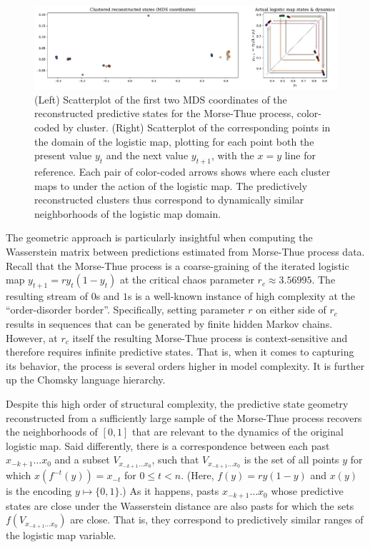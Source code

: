 \documentclass[sigconf, anonymous, review]{acmart}
\begin{document}
\begin{figure}[h]
\centering
\includegraphics[width=\linewidth]{../plots/feig_MDS.pdf}
\caption{(Left) Scatterplot of the first two MDS coordinates of the
	reconstructed predictive states for the Morse-Thue process, color-coded by
	cluster. (Right) Scatterplot of the corresponding points in the domain of
	the logistic map, plotting for each point both the present value $y_t$ and
	the next value $y_{t+1}$, with the $x=y$ line for reference. Each pair of
	color-coded arrows shows where each cluster maps to under the action of the
	logistic map. The predictively reconstructed clusters thus correspond to
	dynamically similar neighborhoods of the logistic map domain.
	}
\label{fig:mds-feig}
\end{figure}

The geometric approach is particularly insightful when computing the
Wasserstein matrix between predictions estimated from Morse-Thue process data.
Recall that the Morse-Thue process is a coarse-graining of the iterated
logistic map $y_{t+1} = ry_t(1-y_t)$ at the critical chaos parameter $r_c
\approx 3.56995$. The resulting stream of $0$s and $1$s is a well-known
instance of high complexity at the ``order-disorder border''. Specifically,
setting parameter $r$ on either side of $r_c$ results in sequences that
can be generated by finite hidden Markov chains. However, at $r_c$ itself the
resulting Morse-Thue process is context-sensitive and therefore requires
infinite predictive states. That is, when it comes to capturing its behavior,
the process is several orders higher in model complexity. It is further up the
Chomsky language hierarchy.

Despite this high order of structural complexity, the predictive state geometry
reconstructed from a sufficiently large sample of the Morse-Thue process
recovers the neighborhoods of $[0,1]$ that are relevant to the dynamics of the
original logistic map. Said differently, there is a correspondence between each
past $x_{-k+1}\dots x_{0}$ and a subset $V_{x_{-k+1}\dots x_{0}}$, such that
$V_{x_{-k+1}\dots x_{0}}$ is the set of all points $y$ for which $x(f^{-t}(y)) =
x_{-t}$ for $0\leq t < n$. (Here, $f(y) = ry(1-y)$ and $x(y)$ is the encoding
$y\mapsto \{0,1\}$.) As it happens, pasts $x_{-k+1}\dots x_{0}$ whose predictive
states are close under the Wasserstein distance are also pasts for which the
sets $f(V_{x_{-k+1}\dots x_{0}})$ are close. That is, they correspond to
predictively similar ranges of the logistic map variable. 
\end{document}
